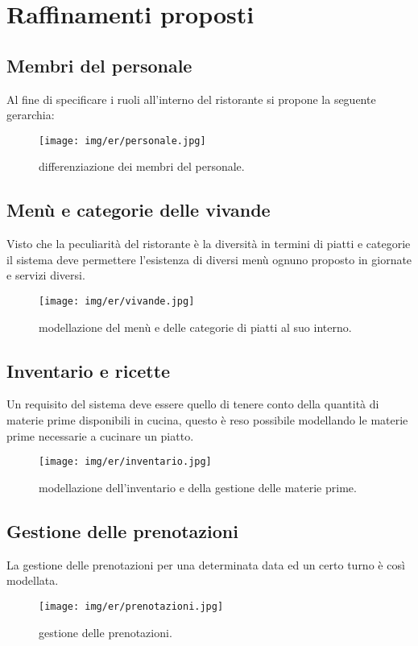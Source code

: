 \documentclass[a4paper,12pt]{report}
\begin{document}
\section{Raffinamenti proposti}
%
\subsection{Membri del personale}
Al fine di specificare i ruoli all’interno del ristorante si propone la seguente gerarchia:
%
\begin{figure}[H]
    \centering
    \texttt{[image: img/er/personale.jpg]}
    \caption{differenziazione dei membri del personale.}
\end{figure}
%
\subsection{Menù e categorie delle vivande}
%
Visto che la peculiarità del ristorante è la diversità in termini di piatti e categorie il sistema deve permettere l’esistenza di diversi menù ognuno proposto in giornate e servizi diversi.
%
\begin{figure}[H]
    \centering
    \texttt{[image: img/er/vivande.jpg]}
    \caption{modellazione del menù e delle categorie di piatti al suo interno.}
\end{figure}
%
\subsection{Inventario e ricette}
%
Un requisito del sistema deve essere quello di tenere conto della quantità di materie prime disponibili in cucina, questo è reso possibile modellando le materie prime necessarie a cucinare un piatto.
%
\begin{figure}[H]
    \centering
    \texttt{[image: img/er/inventario.jpg]}
    \caption{modellazione dell'inventario e della gestione delle materie prime.}
\end{figure}
%
\subsection{Gestione delle prenotazioni}
%
La gestione delle prenotazioni per una determinata data ed un certo turno è così modellata. 
%
\begin{figure}[H]
    \centering
    \texttt{[image: img/er/prenotazioni.jpg]}
    \caption{gestione delle prenotazioni.}
\end{figure}
%
\end{document}

